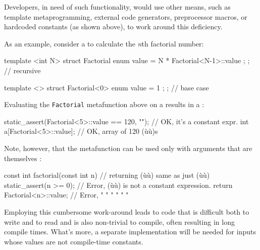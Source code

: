 \noindent Developers, in need of such functionality, would use other means, such
as template metaprogramming, external code generators, preprocessor
macros, or hardcoded constants (as shown above), to work around this
deficiency.

As an example, consider a  to calculate the
\emph{n}th factorial number:

\begin{emcppslisting}[emcppsbatch=e1]
template <int N>
struct Factorial { enum { value = N * Factorial<N-1>::value }; };  // recursive

template <>
struct Factorial<0> { enum { value = 1 }; };                       // base case
\end{emcppslisting}


\noindent Evaluating the \lstinline!Factorial! metafunction above on a
 results in a :

\begin{emcppslisting}[emcppsbatch=e1]
static_assert(Factorial<5>::value == 120, "");  // OK, it's a constant expr.
int a[Factorial<5>::value];                     // OK, array of 120 (ù{}ù)s
\end{emcppslisting}


\noindent Note, however, that the metafunction can be used only with arguments
that are themselves :

\begin{emcppslisting}
const int factorial(const int n)  // returning (ù{}ù) same as just (ù{}ù)
{
    static_assert(n >= 0);        // Error, (ù{}ù) is not a constant expression.
    return Factorial<n>::value;   // Error,  "   "  "  "     "         "
}
\end{emcppslisting}


\noindent Employing this cumbersome work-around leads to code that is difficult
both to write and to read and is also non-trivial to compile, often
resulting in long compile times. What's more, a separate implementation
will be needed for inputs whose values are not compile-time constants.

